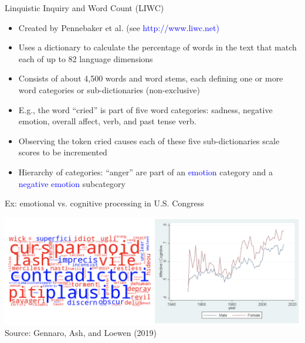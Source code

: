 \documentclass[english]{beamer}
\begin{document}
\begin{frame}{Linquistic Inquiry and Word Count (LIWC)}
\begin{itemize}
\setlength{\itemsep}{1em}
\item Created by Pennebaker et al. (see \textcolor{blue}{http://www.liwc.net)}
\item Uses a dictionary to calculate the percentage of words in the text that match each of up to 82 language dimensions
\item Consists of about 4,500 words and word stems, each defining one or more word categories or sub-dictionaries (non-exclusive)
\item E.g., the word ``cried'' is part of five word categories: sadness, negative emotion, overall affect, verb, and past tense verb.
\item Observing the token cried causes each of these five sub-dictionaries scale scores to be incremented
\item Hierarchy of categories: ``anger'' are part of an \textcolor{blue}{emotion} category and a \textcolor{blue}{negative emotion} subcategory
\end{itemize}
\end{frame}

\begin{frame}{Ex: emotional vs. cognitive processing in U.S. Congress}
\begin{center}
\includegraphics[scale=0.22]{Images/gennaro}
\vspace{10pt}
\normalsize{Source: Gennaro, Ash, and Loewen (2019)}
\end{center}

\end{frame}
\end{document}
